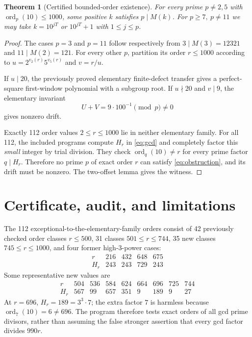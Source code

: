 \documentclass[10pt]{article}
\newtheorem{theorem}{Theorem}
\DeclareMathOperator{\ord}{ord}
\begin{document}
\begin{theorem}[Certified bounded-order existence]
For every prime \(p\ne2,5\) with
\(\ord_p(10)\le1000\), some positive \(k\) satisfies
\(p\mid M(k)\).
For \(p\ge7,\ p\ne11\) we may take
\(k=10^{jT}\) or \(10^{jT}+1\) with \(1\le j\le p\).
\end{theorem}
\begin{proof}
The cases \(p=3\) and \(p=11\) follow respectively
from \(3\mid M(3)=12321\) and \(11\mid M(2)=121\).
For every other \(p\), partition its order \(r\le1000\)
according to \(u=2^{v_2(r)}5^{v_5(r)}\) and \(v=r/u\).

If \(u\mid20\), the previously proved elementary
finite-defect transfer gives a perfect-square
first-window polynomial with a subgroup root.
If \(u\nmid20\) and \(v\mid9\), the elementary invariant
\[
 U+V=9\cdot100^{-1}\pmod p\ne0
\]
gives nonzero drift.

Exactly 112 order values \(2\le r\le1000\) lie in
neither elementary family. For all 112,
the included programs compute \(H_r\) in
\eqref{eq:gcd} and completely factor this
\emph{small} integer by trial division. They check
\(\ord_q(10)\ne r\) for every prime factor \(q\mid H_r\).
Therefore no prime \(p\) of exact order \(r\)
can satisfy \eqref{eq:obstruction}, and its drift
must be nonzero. The two-offset lemma gives the witness.
\end{proof}

\section{Certificate, audit, and limitations}
The 112 exceptional-to-the-elementary-family orders
consist of 42 previously checked order classes \(r\le500\),
31 classes \(501\le r\le744\), 35 new classes \(745\le r\le1000\), and four former
high-\(3\)-power cases:
\[
\begin{array}{c|rrrr}
r&216&432&648&675\\\hline
H_r&243&243&729&243
\end{array}
\]
Some representative new values are
\[
\begin{array}{r|rrrrrrrr}
r&504&536&584&624&664&696&725&744\\\hline
H_r&567&99&657&351&9&189&9&27
\end{array}
\]
At \(r=696\), \(H_r=189=3^3\cdot7\);
the extra factor \(7\) is harmless because
\(\ord_7(10)=6\ne696\).
The program therefore tests exact orders of
all gcd prime divisors, rather than assuming the
false stronger assertion that every gcd factor divides
\(990r\).
\end{document}
